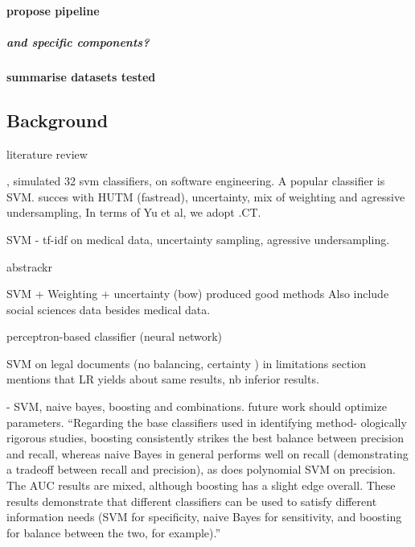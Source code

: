 \documentclass[
]{article}
\begin{document}
\hypertarget{propose-pipeline}{%
\paragraph{propose pipeline}\label{propose-pipeline}}

\hypertarget{and-specific-components}{%
\subparagraph{and specific components?}\label{and-specific-components}}

\hypertarget{summarise-datasets-tested}{%
\paragraph{summarise datasets tested}\label{summarise-datasets-tested}}

\hfill\break
\hfill\break

\hypertarget{background}{%
\subsection{Background}\label{background}}

\autocite{OMara-Eves2015} literature review

\autocite{Yu2018a}, \autocite{Yu2019} simulated 32 svm classifiers, on
software engineering. A popular classifier is SVM. succes with HUTM
(fastread), uncertainty, mix of weighting and agressive undersampling,
In terms of Yu et al, we adopt .CT.

SVM - tf-idf on medical data, uncertainty sampling, agressive
undersampling. \autocite{Wallace2010}

abstrackr

SVM + Weighting + uncertainty (bow) produced good methods
\autocite{Miwa2014} Also include social sciences data besides medical
data.

\autocite{Cohen2006} perceptron-based classifier (neural network)

SVM on legal documents (no balancing, certainty ) \autocite{Cormack2014}
in limitations section mentions that LR yields about same results, nb
inferior results.

\autocite{Kilicoglu2009} - SVM, naive bayes, boosting and combinations.
future work should optimize parameters. ``Regarding the base classifiers
used in identifying method- ologically rigorous studies, boosting
consistently strikes the best balance between precision and recall,
whereas naive Bayes in general performs well on recall (demonstrating a
tradeoff between recall and precision), as does polynomial SVM on
precision. The AUC results are mixed, although boosting has a slight
edge overall. These results demonstrate that different classifiers can
be used to satisfy different information needs (SVM for specificity,
naive Bayes for sensitivity, and boosting for balance between the two,
for example).''
\end{document}
